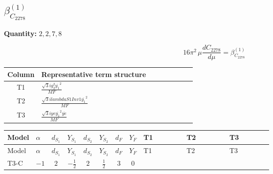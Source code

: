 \documentclass[8pt]{article}
\begin{document}
\begin{landscape}
\section*{$\beta_{C_{2278}}^{(1)}$}
\noindent\textbf{Quantity: }$\mathrm{2,2,7,8}$\par\smallskip
\[16\pi^2\,\mu\frac{d C_{2278}}{d\mu}=\beta_{C_{2278}}^{(1)}\]
\begin{center}
\begin{tabular}{@{}c >{\raggedright\arraybackslash}p{0.82\linewidth}@{}}
\toprule
Column & Representative term structure \\
\midrule
T1 & \(\displaystyle \frac{\sqrt{3} i g_{2}^{2} \overline{y_{1}}^{2}}{MF}\) \\
\midrule
T2 & \(\displaystyle \frac{\sqrt{3} i lambdaS1Inv1 \overline{y_{1}}^{2}}{MF}\) \\
\midrule
T3 & \(\displaystyle \frac{\sqrt{3} i ye \overline{y_{1}}^{2} \overline{ye}}{MF}\) \\
\midrule
\bottomrule
\end{tabular}
\end{center}
\smallskip
\tiny
\begin{longtable}{@{}llcccccc >{\raggedright\arraybackslash}p{0.21\linewidth} >{\raggedright\arraybackslash}p{0.21\linewidth} >{\raggedright\arraybackslash}p{0.21\linewidth}@{}}
\toprule
Model & $\alpha$ & $d_{S_1}$ & $Y_{S_1}$ & $d_{S_2}$ & $Y_{S_2}$ & $d_F$ & $Y_F$ & T1 & T2 & T3 \\
\midrule
\endfirsthead
\toprule
Model & $\alpha$ & $d_{S_1}$ & $Y_{S_1}$ & $d_{S_2}$ & $Y_{S_2}$ & $d_F$ & $Y_F$ & T1 & T2 & T3 \\
\midrule
\endhead
T3-C & $-1$ & $2$ & $-\frac{1}{2}$ & $2$ & $\frac{1}{2}$ & $3$ & $0$ & \scriptsize\adjustbox{max width=\linewidth}{$\begin{gathered} \frac{\sqrt{3} i g_{2}^{2} \overline{y_{1}}^{2}}{4 MF}\end{gathered}$} & \scriptsize\adjustbox{max width=\linewidth}{$\begin{gathered} \frac{\sqrt{3} i lambdaS1Inv1 \overline{y_{1}}^{2}}{6 MF}\end{gathered}$} & \scriptsize\adjustbox{max width=\linewidth}{$\begin{gathered} - \frac{\sqrt{3} i ye \overline{y_{1}}^{2} \overline{ye}}{12 MF}\end{gathered}$} \\
\midrule
\bottomrule
\end{longtable}
\clearpage

\end{landscape}
\end{document}
